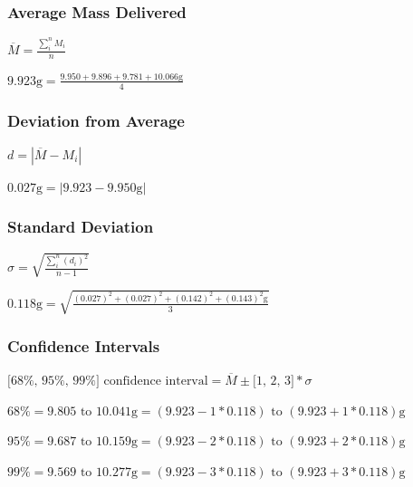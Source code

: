 \documentclass[fleqn,titlepage]{article}
\begin{document}
    \subsubsection*{Average Mass Delivered}
      \begin{center}$\overline{M} = \frac{\sum\limits_{i}^{n}M_{i}}{n}$\end{center}
      \begin{center}$9.923\text{g} = \frac{9.950 + 9.896 + 9.781 + 10.066\text{g}}{4}$\end{center}

    \subsubsection*{Deviation from Average}
      \begin{center}$d = |\overline{M} - M_i|$\end{center}
      \begin{center}$0.027\text{g} = |9.923 - 9.950\text{g}|$\end{center}

    \subsubsection*{Standard Deviation}
      \begin{center}$\sigma = \sqrt{\frac{\sum\limits_{i}^{n}(d_{i})^2}{n-1}}$\end{center}
      \begin{center}$0.118\text{g} = \sqrt{\frac{(0.027)^2 + (0.027)^2 + (0.142)^2 + (0.143)^2\text{g}}{3}}$\end{center}

    \subsubsection*{Confidence Intervals}
      \begin{center}$\text{[68\%, 95\%, 99\%] confidence interval} = \overline{M} \pm \text{[1, 2, 3]} * \sigma$\end{center}
      \begin{center}$68\% = 9.805 \text{ to } 10.041\text{g} = (9.923 - 1*0.118) \text{ to } (9.923 + 1*0.118)\text{g}$\end{center}
      \begin{center}$95\% = 9.687 \text{ to } 10.159\text{g} = (9.923 - 2*0.118) \text{ to } (9.923 + 2*0.118)\text{g}$\end{center}
      \begin{center}$99\% = 9.569 \text{ to } 10.277\text{g} = (9.923 - 3*0.118) \text{ to } (9.923 + 3*0.118)\text{g}$\end{center}
\end{document}
